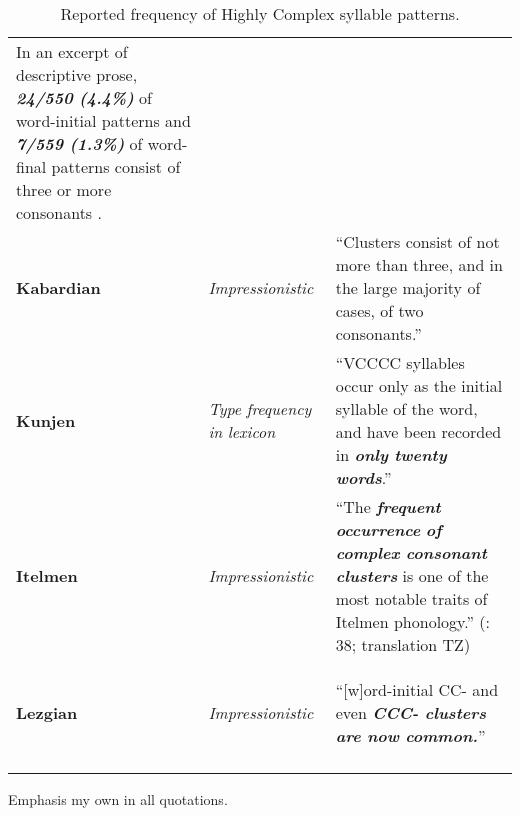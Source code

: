 \begin{table}
\begin{tabularx}{\textwidth}{XXX}
In an excerpt of descriptive prose, \textbf{\textit{24/550} \textit{(4.4\%)}} of word-initial patterns and \textbf{\textit{7/559} \textit{(1.3\%)}} of word-final patterns consist of three or more consonants \citep[79-80]{Vogt1958}.\\
\textbf{Kabardian} & \textit{Impressionistic} & “Clusters consist of not more than three, and in the large majority of cases, of two consonants.” \citep[29]{Kuipers1960}\\
\textbf{Kunjen} & \textit{Type} \textit{frequency} \textit{in} \textit{lexicon} & “VCCCC syllables occur only as the initial syllable of the word, and have been recorded in \textbf{\textit{only} \textit{twenty} \textit{words}}.” \citep[35]{Sommer1969}\\
\textbf{Itelmen} & \textit{Impressionistic} & “The \textbf{\textit{frequent} \textit{occurrence}} \textbf{\textit{of} \textit{complex} \textit{consonant} \textit{clusters}} is one of the most notable traits of Itelmen phonology.” (\citealt{GeorgVolodin1999}: 38; translation TZ)\\
\textbf{Lezgian} & \textit{Impressionistic} & “[w]ord-initial CC- and even \textbf{\textit{CCC-} \textit{clusters} \textit{are} \textit{now} \textit{common.}}” 

\citep[46]{Haspelmath1993}\\
\lspbottomrule
\end{tabularx}
\caption{\label{3.14}Reported frequency of Highly Complex syllable patterns.}Emphasis my own in all quotations.
\end{table}







